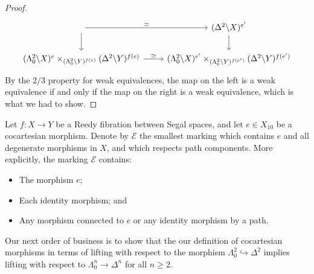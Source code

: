 \documentclass[main.tex]{subfiles}
\begin{document}
\begin{proof}
\begin{equation*}
\begin{tikzcd}
      \arrow[r, "\simeq"]
      \arrow[d]
      & (\Delta^{2} \backslash X)^{e'}
      \arrow[d]
      \\
      (\Lambda^{2}_{0} \backslash X)^{e} \times_{(\Lambda^{2}_{0} \backslash Y)^{f(e)}} (\Delta^{2} \backslash Y)^{f(e)}
      \arrow[r, "\simeq"]
      & (\Lambda^{2}_{0} \backslash X)^{e'} \times_{(\Lambda^{2}_{0} \backslash Y)^{f(e')}} (\Delta^{2} \backslash Y)^{f(e')}
    \end{tikzcd}
  \end{equation*}
  By the $2/3$ property for weak equivalences, the map on the left is a weak equivalence if and only if the map on the right is a weak equivalence, which is what we had to show.
\end{proof}

\begin{definition}
  \label{def:morphism_generated_marking}
  Let $f\colon X \to Y$ be a Reedy fibration between Segal spaces, and let $e \in X_{10}$ be a cocartesian morphism. Denote by $\mathcal{E}$ the smallest marking which contains $e$ and all degenerate morphisms in $X$, and which respects path components. More explicitly, the marking $\mathcal{E}$ contains:
  \begin{itemize}
    \item The morphism $e$;

    \item Each identity morphism; and

    \item Any morphism connected to $e$ or any identity morphism by a path.
  \end{itemize}
\end{definition}

Our next order of business is to show that the our definition of cocartesian morphisms in terms of lifting with respect to the morphism $\Lambda^{2}_{0} \hookrightarrow \Delta^{2}$ implies lifting with respect to $\Lambda^{n}_{0} \to \Delta^{n}$ for all $n \geq 2$.
\end{document}
